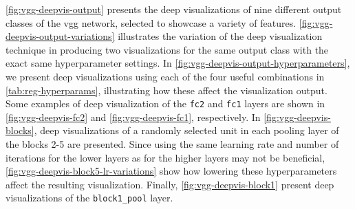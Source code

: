 \noindent \autoref{fig:vgg-deepvis-output} presents the deep visualizations of nine different output classes of the \acrshort{vgg} network, selected to showcase a variety of features. \autoref{fig:vgg-deepvis-output-variations} illustrates the variation of the deep visualization technique in producing two visualizations for the same output class with the exact same hyperparameter settings. In \autoref{fig:vgg-deepvis-output-hyperparameters}, we present deep visualizations using each of the four useful combinations in \autoref{tab:reg-hyperparams}, illustrating how these affect the visualization output. \\

\noindent Some examples of deep visualization of the \texttt{fc2} and \texttt{fc1} layers are shown in \autoref{fig:vgg-deepvis-fc2} and \autoref{fig:vgg-deepvis-fc1}, respectively. In \autoref{fig:vgg-deepvis-blocks}, deep visualizations of a randomly selected unit in each pooling layer of the blocks 2-5 are presented. Since using the same learning rate and number of iterations for the lower layers as for the higher layers may not be beneficial, \autoref{fig:vgg-deepvis-block5-lr-variations} show how lowering these hyperparameters affect the resulting visualization. Finally, \autoref{fig:vgg-deepvis-block1} present deep visualizations of the \texttt{block1\_pool} layer.

